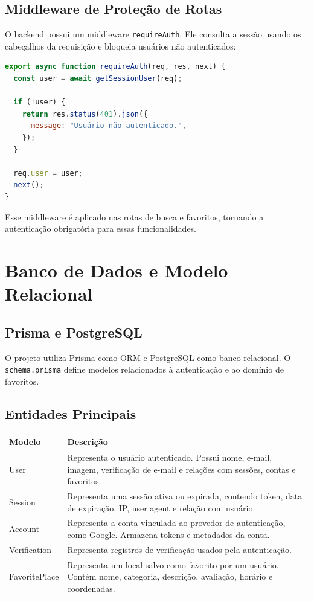 \documentclass[
    12pt,
    oneside,
    openright,
    a4paper,
    english,
    brazil
]{abntex2}
\begin{document}
\section{Middleware de Proteção de Rotas}

O backend possui um middleware \texttt{requireAuth}. Ele consulta a sessão usando os cabeçalhos da requisição e bloqueia usuários não autenticados:

\begin{lstlisting}[language=JavaScript, caption={Middleware requireAuth}]
export async function requireAuth(req, res, next) {
  const user = await getSessionUser(req);

  if (!user) {
    return res.status(401).json({
      message: "Usuário não autenticado.",
    });
  }

  req.user = user;
  next();
}
\end{lstlisting}

Esse middleware é aplicado nas rotas de busca e favoritos, tornando a autenticação obrigatória para essas funcionalidades.


\chapter{Banco de Dados e Modelo Relacional}

\section{Prisma e PostgreSQL}

O projeto utiliza Prisma como ORM e PostgreSQL como banco relacional. O \texttt{schema.prisma} define modelos relacionados à autenticação e ao domínio de favoritos.

\section{Entidades Principais}

\begin{longtable}{|p{3cm}|p{11cm}|}
\hline
\textbf{Modelo} & \textbf{Descrição} \\
\hline
User & Representa o usuário autenticado. Possui nome, e-mail, imagem, verificação de e-mail e relações com sessões, contas e favoritos. \\
\hline
Session & Representa uma sessão ativa ou expirada, contendo token, data de expiração, IP, user agent e relação com usuário. \\
\hline
Account & Representa a conta vinculada ao provedor de autenticação, como Google. Armazena tokens e metadados da conta. \\
\hline
Verification & Representa registros de verificação usados pela autenticação. \\
\hline
FavoritePlace & Representa um local salvo como favorito por um usuário. Contém nome, categoria, descrição, avaliação, horário e coordenadas. \\
\hline
\end{longtable}
\end{document}
